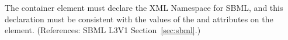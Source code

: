 The  container element must declare the XML Namespace
for SBML, and this declaration must be consistent with the values
of the  and  attributes on the 
 element.  (References: SBML
L3V1 Section~\ref{sec:sbml}.)
